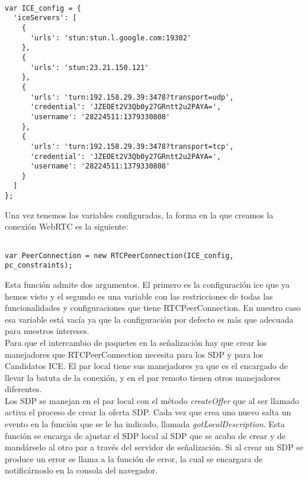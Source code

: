\begin{lstlisting}[caption=Servidores STUN y TURN]

var ICE_config = {
  'iceServers': [
    {
      'urls': 'stun:stun.l.google.com:19302'
    },
    {
      'urls': 'stun:23.21.150.121'
    },
    {
      'urls': 'turn:192.158.29.39:3478?transport=udp',
      'credential': 'JZEOEt2V3Qb0y27GRntt2u2PAYA=',
      'username': '28224511:1379330808'
    },
    {
      'urls': 'turn:192.158.29.39:3478?transport=tcp',
      'credential': 'JZEOEt2V3Qb0y27GRntt2u2PAYA=',
      'username': '28224511:1379330808'
    }
  ]
};

\end{lstlisting}

Una vez tenemos las variables configuradas, la forma en la que creamos la conexión WebRTC es la siguiente:\\

\begin{lstlisting}[caption=RTCPeerConnection.]

var PeerConnection = new RTCPeerConnection(ICE_config, pc_constraints);

\end{lstlisting}

Esta función admite dos argumentos. El primero es la configuración ice que ya hemos visto y el segundo es una variable con las restricciones de todas las funcionalidades y configuraciones que tiene RTCPeerConnection. En nuestro caso esa variable está vacía ya que la configuración por defecto es más que adecuada para nuestros intereses.\\

Para que el intercambio de paquetes en la señalización hay que crear los manejadores que RTCPeerConnection necesita para los SDP y para los Candidatos ICE. El par local tiene sus manejadores ya que es el encargado de llevar la batuta de la conexión, y en el par remoto tienen otros manejadores diferentes. \\

Los SDP se manejan en el par local con el método \emph{createOffer} que al ser llamado activa el proceso de crear la oferta SDP. Cada vez que crea uno nuevo salta un evento en la función que se le ha indicado, llamada \emph{gotLocalDescription}. Esta función se encarga de ajustar el SDP local al SDP que se acaba de crear y de mandárselo al otro par a través del servidor de señalización. Si al crear un SDP se produce un error se llama a la función de error, la cual se encargara de notificárnoslo en la consola del navegador.\\


